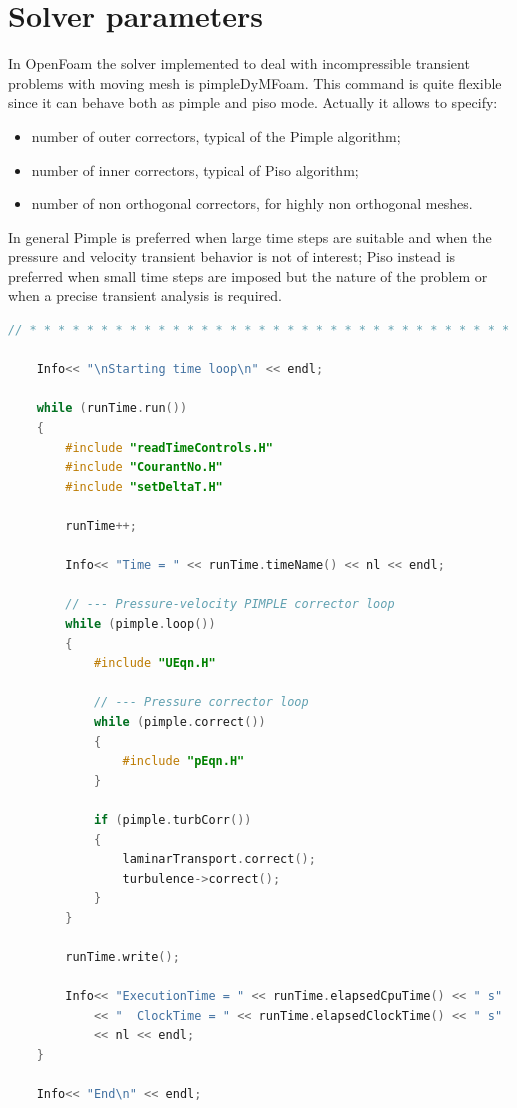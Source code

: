 \documentclass[a4paper,12pt]{article}
\newcommand{\foam}[1]{{\ttfamily #1}}
\begin{document}

\section{Solver parameters}

In OpenFoam the solver implemented to deal with incompressible transient problems with moving mesh is \foam{pimpleDyMFoam}.
This command is quite flexible since it can behave both as pimple and piso mode. 
Actually it allows to specify:
\begin{itemize}
\item number of outer correctors, typical of the Pimple algorithm;
\item number of inner correctors, typical of Piso algorithm;
\item number of non orthogonal correctors, for highly non orthogonal meshes.
\end{itemize}

In general Pimple is preferred when large time steps are suitable and when the pressure and velocity transient behavior is not of interest;
Piso instead is preferred when small time steps are imposed but the nature of the problem or when a precise transient analysis is required.

\begin{lstlisting}[language=c++, caption={\foam{pimpleFoam} source code extract.}]
// * * * * * * * * * * * * * * * * * * * * * * * * * * * * * * * * * * * //

    Info<< "\nStarting time loop\n" << endl;

    while (runTime.run())
    {
        #include "readTimeControls.H"
        #include "CourantNo.H"
        #include "setDeltaT.H"

        runTime++;

        Info<< "Time = " << runTime.timeName() << nl << endl;

        // --- Pressure-velocity PIMPLE corrector loop
        while (pimple.loop())
        {
            #include "UEqn.H"

            // --- Pressure corrector loop
            while (pimple.correct())
            {
                #include "pEqn.H"
            }

            if (pimple.turbCorr())
            {
                laminarTransport.correct();
                turbulence->correct();
            }
        }

        runTime.write();

        Info<< "ExecutionTime = " << runTime.elapsedCpuTime() << " s"
            << "  ClockTime = " << runTime.elapsedClockTime() << " s"
            << nl << endl;
    }

    Info<< "End\n" << endl;
\end{lstlisting}
\end{document}
